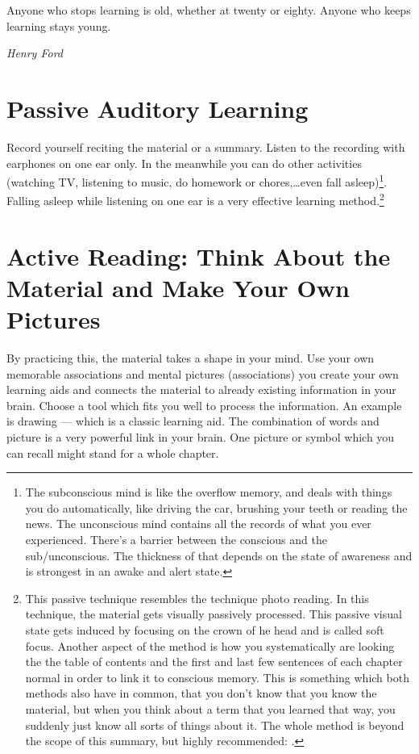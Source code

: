 \documentclass[../main.tex]{subfiles}
\begin{document}
\epigraph{Anyone who stops learning is old, whether at twenty or eighty. Anyone who keeps learning stays young.}{\textit{Henry Ford}}



\section{Passive Auditory Learning}
{Record} yourself reciting the material or a summary.
{Listen to the recording} with earphones on {one ear} only. 
In the meanwhile you can {do other activities} (watching TV, listening to music, do homework or chores,\ldots even fall asleep)\footnote{The {subconscious} mind is like the overflow memory, and deals with things you do automatically, like driving the car, brushing your teeth or reading the news.
The {unconscious mind} contains all the records of what you ever experienced.
There's a barrier between the conscious and the sub/unconscious. The thickness of that depends on the state of awareness and is strongest in an awake and alert state.}.
{Falling asleep while listening on one ear is a very effective learning method.}\footnote{This passive technique resembles the technique photo reading. In this technique, the material gets visually passively processed. This passive visual state gets induced by focusing on the crown of he head and is called soft focus. Another aspect of the method is how you systematically are looking the the table of contents and the first and last few sentences of each chapter normal in order to link it to conscious memory. This is something which both methods also have in common, that you don't know that you know the material, but when you think about a term that you learned that way, you suddenly just know all sorts of things about it.
  The whole method is beyond the scope of this summary, but highly recommended: \cite{Photoreading}.}


\section[Active Reading]{Active Reading: Think About the Material and Make Your Own Pictures}
By practicing this, the material takes a shape in your mind.
Use your own {memorable associations} and mental pictures (associations) you create your own learning aids and connects the material to already existing information in your brain.
Choose a tool which fits you well to process the information. An example is drawing --- which is a classic learning aid.
{The combination of words and picture is a very powerful link in your brain. One picture or symbol which you can recall might stand for a whole chapter.}
\end{document}
